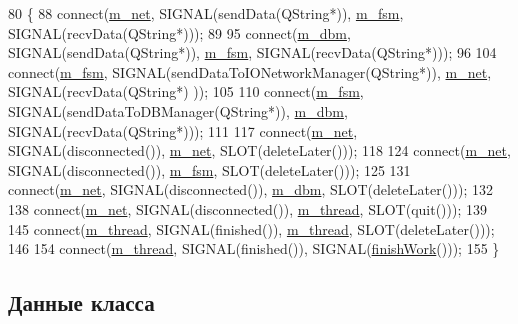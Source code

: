 \begin{DoxyCode}
80 \{
88     connect(\hyperlink{class_c_server_controller_a64ce9925628d153d9576ee4534380dac}{m\_net}, SIGNAL(sendData(QString*)), \hyperlink{class_c_server_controller_a3282dabaabac03bdb3447001c186a97f}{m\_fsm}, SIGNAL(recvData(QString*)));
89 
95     connect(\hyperlink{class_c_server_controller_ab147bebeb63fe45d845090f0a4750582}{m\_dbm}, SIGNAL(sendData(QString*)), \hyperlink{class_c_server_controller_a3282dabaabac03bdb3447001c186a97f}{m\_fsm}, SIGNAL(recvData(QString*)));
96 
104     connect(\hyperlink{class_c_server_controller_a3282dabaabac03bdb3447001c186a97f}{m\_fsm}, SIGNAL(sendDataToIONetworkManager(QString*)), \hyperlink{class_c_server_controller_a64ce9925628d153d9576ee4534380dac}{m\_net}, SIGNAL(recvData(QString*)
      ));
105 
110     connect(\hyperlink{class_c_server_controller_a3282dabaabac03bdb3447001c186a97f}{m\_fsm}, SIGNAL(sendDataToDBManager(QString*)), \hyperlink{class_c_server_controller_ab147bebeb63fe45d845090f0a4750582}{m\_dbm}, SIGNAL(recvData(QString*)));
111 
117     connect(\hyperlink{class_c_server_controller_a64ce9925628d153d9576ee4534380dac}{m\_net}, SIGNAL(disconnected()), \hyperlink{class_c_server_controller_a64ce9925628d153d9576ee4534380dac}{m\_net}, SLOT(deleteLater()));
118 
124     connect(\hyperlink{class_c_server_controller_a64ce9925628d153d9576ee4534380dac}{m\_net}, SIGNAL(disconnected()), \hyperlink{class_c_server_controller_a3282dabaabac03bdb3447001c186a97f}{m\_fsm}, SLOT(deleteLater()));
125 
131     connect(\hyperlink{class_c_server_controller_a64ce9925628d153d9576ee4534380dac}{m\_net}, SIGNAL(disconnected()), \hyperlink{class_c_server_controller_ab147bebeb63fe45d845090f0a4750582}{m\_dbm}, SLOT(deleteLater()));
132 
138     connect(\hyperlink{class_c_server_controller_a64ce9925628d153d9576ee4534380dac}{m\_net}, SIGNAL(disconnected()), \hyperlink{class_c_server_controller_a4a4764db869209e68283af91608f9751}{m\_thread}, SLOT(quit()));
139 
145     connect(\hyperlink{class_c_server_controller_a4a4764db869209e68283af91608f9751}{m\_thread}, SIGNAL(finished()), \hyperlink{class_c_server_controller_a4a4764db869209e68283af91608f9751}{m\_thread}, SLOT(deleteLater()));
146 
154     connect(\hyperlink{class_c_server_controller_a4a4764db869209e68283af91608f9751}{m\_thread}, SIGNAL(finished()), SIGNAL(\hyperlink{class_c_server_controller_a49ac8bb325430fc9112056d862c5c117}{finishWork}()));
155 \}
\end{DoxyCode}


\subsection{Данные класса}
\hypertarget{class_c_server_controller_ab147bebeb63fe45d845090f0a4750582}{}\label{class_c_server_controller_ab147bebeb63fe45d845090f0a4750582} 
